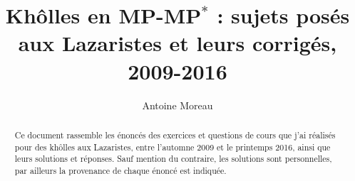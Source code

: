 \documentclass[a4paper,10pt]{report}
\title{Kh\^olles en MP-MP${}^{\ast}$ : sujets pos\'es aux Lazaristes et leurs corrig\'es, 2009-2016}
\author{Antoine Moreau}
\begin{document}
\maketitle

\begin{abstract}
Ce document rassemble les \'enonc\'es des exercices et questions de cours que j'ai r\'ealis\'es pour des kh\^olles aux Lazaristes, %
entre l'automne 2009 et le printemps 2016, %
ainsi que leurs solutions et r\'eponses. %
Sauf mention du contraire, les solutions sont personnelles, par ailleurs la provenance de chaque \'enonc\'e est indiqu\'ee.
\end{abstract}


\tableofcontents







% 
% 
% 


% 
% 


% 
\end{document}
